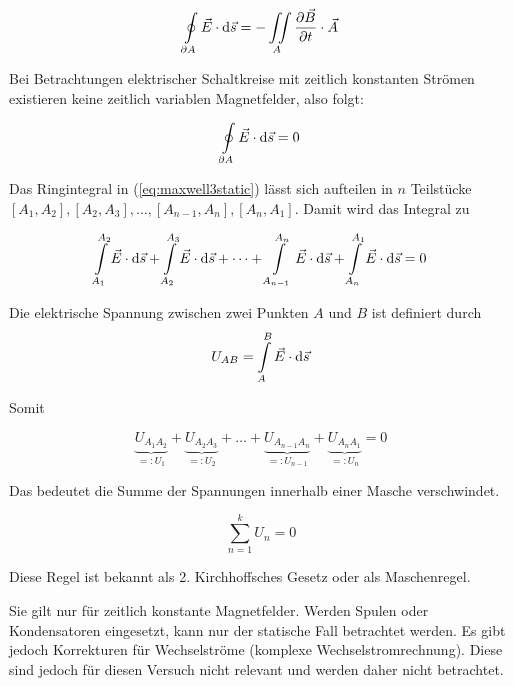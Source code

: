 \documentclass[a4paper,german,12pt,smallheadings]{scrartcl}
\begin{document}
\begin{equation}
  \oint\limits_{\partial A} \vec{E} \cdot \dif \vec{s} = - \iint\limits_{A} \frac{\partial \vec{B}}{\partial t} \cdot \vec{A}
\end{equation}


Bei Betrachtungen elektrischer Schaltkreise mit zeitlich konstanten Strömen
existieren keine zeitlich variablen Magnetfelder, also folgt:

\begin{equation}
  \oint\limits_{\partial A} \vec{E} \cdot \dif \vec{s} = 0
  \label{eq:maxwell3static}
\end{equation}


Das Ringintegral in (\ref{eq:maxwell3static}) lässt sich aufteilen in $n$
Teilstücke $[A_1, A_2], [A_2, A_3], \dots, [A_{n-1}, A_n], [A_n, A_1]$. Damit
wird das Integral zu

\begin{equation}
  \int\limits_{A_1}^{A_2} \vec{E} \cdot \dif \vec{s} +
  \int\limits_{A_2}^{A_3} \vec{E} \cdot \dif \vec{s} +
  \dots +
  \int\limits_{A_{n-1}}^{A_n} \vec{E} \cdot \dif \vec{s} +
  \int\limits_{A_{n}}^{A_1} \vec{E} \cdot \dif \vec{s}
  = 0
\end{equation}

Die elektrische Spannung zwischen zwei Punkten $A$ und $B$ ist definiert durch
\begin{equation}
  U_{AB} = \int\limits_A^B \vec{E} \cdot \dif \vec{s}
\end{equation}

Somit

\begin{equation}
  \underbrace{U_{A_1A_2}}_{=: U_1} +
  \underbrace{U_{A_2A_3}}_{=: U_2} +
  \dots +
  \underbrace{U_{A_{n-1}A_n}}_{=: U_{n-1}} +
  \underbrace{U_{A_nA_1}}_{=: U_n} = 0
\end{equation}

Das bedeutet die Summe der Spannungen innerhalb einer Masche verschwindet.

\begin{equation}
  \sum_{n=1}^k U_n = 0
\end{equation}

Diese Regel ist bekannt als 2. Kirchhoffsches Gesetz oder als Maschenregel.

Sie gilt nur für zeitlich konstante Magnetfelder. Werden Spulen oder
Kondensatoren eingesetzt, kann nur der statische Fall betrachtet werden. Es
gibt jedoch Korrekturen für Wechselströme (komplexe Wechselstromrechnung).
Diese sind jedoch für diesen Versuch nicht relevant und werden daher nicht
betrachtet.
\end{document}
